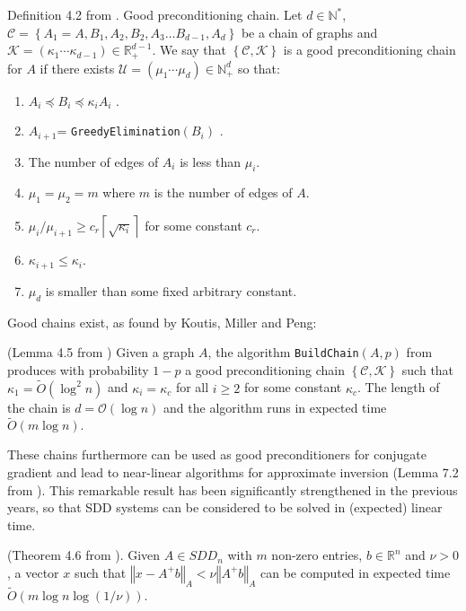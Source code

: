 \begin{definition}
Definition 4.2 from \cite{Koutis2011}. Good preconditioning chain.
Let $d\in\mathbb{N}^{*}$, $\mathcal{C}=\left\{ A_{1}=A,B_{1},A_{2},B_{2},A_{3}\dots B_{d-1},A_{d}\right\} $
be a chain of graphs and $\mathcal{K}=\left(\kappa_{1}\cdots\kappa_{d-1}\right)\in\mathbb{R}_{+}^{d-1}$.
We say that $\left\{ \mathcal{C},\mathcal{K}\right\} $ is a good
preconditioning chain for $A$ if there exists $\mathcal{U}=\left(\mu_{1}\cdots\mu_{d}\right)\in\mathbb{N}_{+}^{d}$
so that: 
\begin{enumerate}
\item $A_{i}\preceq B_{i}\preceq\kappa_{i}A_{i}$ . 
\item $A_{i+1}$= \texttt{GreedyElimination}$\left(B_{i}\right)$ . %

\item The number of edges of $A_{i}$ is less than $\mu_{i}$. 
\item $\mu_{1}=\mu_{2}=m$ where $m$ is the number of edges of $A$. 
\item $\mu_{i}/\mu_{i+1}\geq c_{r}\left\lceil \sqrt{\kappa_{i}}\right\rceil $
for some constant $c_{r}$. 
\item $\kappa_{i+1}\leq\kappa_{i}$. 
\item $\mu_{d}$ is smaller than some fixed arbitrary constant. 
\end{enumerate}
\end{definition}
Good chains exist, as found by Koutis, Miller and Peng: 
\begin{lemma}
\label{lem:good-chain} (Lemma 4.5 from \cite{Koutis2011}) Given
a graph $A$, the algorithm \texttt{BuildChain}$\left(A,p\right)$
from \cite{Koutis2011} produces with probability $1-p$ a good preconditioning
chain $\left\{ \mathcal{C},\mathcal{K}\right\} $ such that $\kappa_{1}=\tilde{O}\left(\log^{2}n\right)$
and $\kappa_{i}=\kappa_{c}$ for all $i\geq2$ for some constant $\kappa_{c}$.
The length of the chain is $d=\mathcal{O}\left(\log n\right)$ and
the algorithm runs in expected time $\tilde{O}\left(m\log n\right).$%

\end{lemma}
These chains furthermore can be used as good preconditioners for conjugate
gradient and lead to near-linear algorithms for approximate inversion
(Lemma 7.2 from \cite{Koutis2010}). This remarkable result has been
significantly strengthened in the previous years, so that SDD systems
can be considered to be solved in (expected) linear time. 
\begin{lemma}
\label{lem:linear-precond-existence}(Theorem 4.6 from \cite{Koutis2011}).
Given $A\in SDD_{n}$ with $m$ non-zero entries, $b\in\mathbb{R}^{n}$
and $\nu>0$, a vector $x$ such that $\left\Vert x-A^{+}b\right\Vert _{A}<\nu\left\Vert A^{+}b\right\Vert _{A}$
can be computed in expected time $\tilde{O}\left(m\log n\log\left(1/\nu\right)\right)$. 
\end{lemma}


